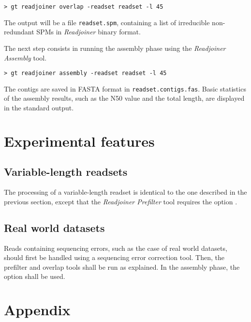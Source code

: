 \documentclass[12pt,titlepage]{article}
\newcommand{\Readjoiner}{\textit{Readjoiner}\xspace}
\newcommand{\Rdjprefilter}{\textit{Readjoiner Prefilter}\xspace}
\newcommand{\Rdjassembly}{\textit{Readjoiner Assembly}\xspace}
\begin{document}
\begin{footnotesize}
\begin{verbatim}
> gt readjoiner overlap -readset readset -l 45
\end{verbatim}
\end{footnotesize}

The output will be a file \texttt{readset.spm}, containing
a list of irreducible non-redundant SPMs in \Readjoiner binary format.

The next step consists in running the assembly phase using the
\Rdjassembly tool.

\begin{footnotesize}
\begin{verbatim}
> gt readjoiner assembly -readset readset -l 45
\end{verbatim}
\end{footnotesize}

The contigs are saved in FASTA format in \texttt{readset.contigs.fas}.
Basic statistics of the assembly results, such as the N50 value
and the total length, are displayed in the standard output.

\section{Experimental features}

\subsection{Variable-length readsets}

The processing of a variable-length readset is identical to the one described
in the previous section, except that the \Rdjprefilter tool requires
the option .

\subsection{Real world datasets}

Reads containing sequencing errors, such as the case of real world datasets,
should first be handled using a sequencing error correction tool.
Then, the prefilter and overlap tools shall be run as explained.
In the assembly phase, the  option shall be used.

\section{Appendix}
\end{document}
